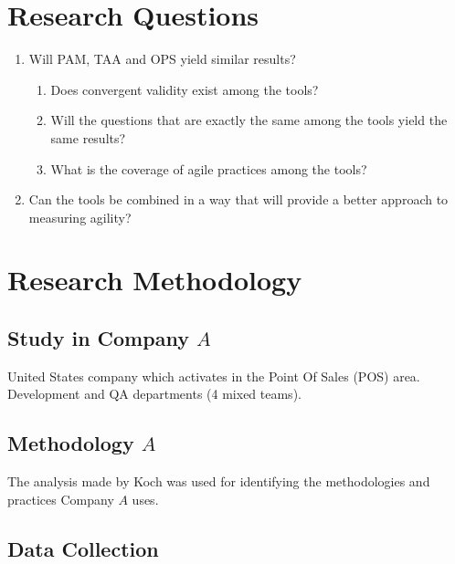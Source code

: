 
\section{Research Questions}

\begin{enumerate}
	\item Will PAM, TAA and OPS yield similar results?
	\begin{enumerate}[label*=\arabic*.]
  		\item Does convergent validity exist among the tools?
  		\item Will the questions that are exactly the same among the tools yield the same results?
		\item What is the coverage of agile practices among the tools?
	\end{enumerate}	
  	\item Can the tools be combined in a way that will provide a better approach to measuring agility?
\end{enumerate}

\clearpage



\section{Research Methodology}


\subsection{Study in Company $A$}

United States company which activates in the Point Of Sales (POS) area. \\
Development and QA departments (4 mixed teams). \\

\subsection{Methodology $A$}
The analysis made by Koch \cite{koch2005agile} was used for identifying the methodologies and practices Company $A$ uses.

\subsection{Data Collection}

